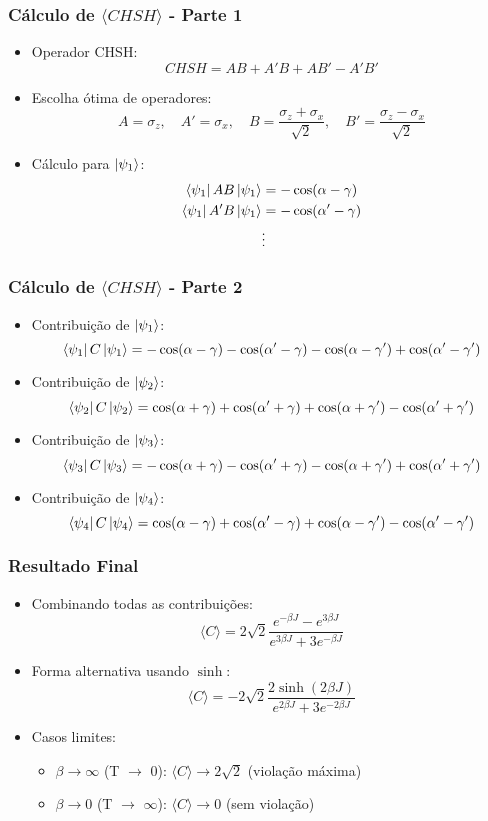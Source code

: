 \documentclass{beamer}
\begin{document}
	\begin{frame}
		\frametitle{Cálculo de $\langle CHSH \rangle$ - Parte 1}
		\begin{itemize}
			\item Operador CHSH:
			\[
			CHSH = AB + A'B + AB' - A'B'
			\]
			\item Escolha ótima de operadores:
			\[
			A = \sigma_z, \quad A' = \sigma_x, \quad B = \frac{\sigma_z + \sigma_x}{\sqrt{2}}, \quad B' = \frac{\sigma_z - \sigma_x}{\sqrt{2}}
			\]
			\item Cálculo para $\ket{\psi_1}$:
			\begin{align*}
				\bra{\psi_1}AB\ket{\psi_1} &= -\cos(\alpha - \gamma) \\
				\bra{\psi_1}A'B\ket{\psi_1} &= -\cos(\alpha' - \gamma) \\
				&\vdots
			\end{align*}
		\end{itemize}
	\end{frame}
	
	\begin{frame}
		\frametitle{Cálculo de $\langle CHSH \rangle$ - Parte 2}
		\begin{itemize}
			\item Contribuição de $\ket{\psi_1}$:
			\[
			\bra{\psi_1}C\ket{\psi_1} = -\cos(\alpha-\gamma) - \cos(\alpha'-\gamma) - \cos(\alpha-\gamma') + \cos(\alpha'-\gamma')
			\]
			\item Contribuição de $\ket{\psi_2}$:
			\[
			\bra{\psi_2}C\ket{\psi_2} = \cos(\alpha+\gamma) + \cos(\alpha'+\gamma) + \cos(\alpha+\gamma') - \cos(\alpha'+\gamma')
			\]
			\item Contribuição de $\ket{\psi_3}$:
			\[
			\bra{\psi_3}C\ket{\psi_3} = -\cos(\alpha+\gamma) - \cos(\alpha'+\gamma) - \cos(\alpha+\gamma') + \cos(\alpha'+\gamma')
			\]
			\item Contribuição de $\ket{\psi_4}$:
			\[
			\bra{\psi_4}C\ket{\psi_4} = \cos(\alpha-\gamma) + \cos(\alpha'-\gamma) + \cos(\alpha-\gamma') - \cos(\alpha'-\gamma')
			\]
		\end{itemize}
	\end{frame}
	
	\begin{frame}
		\frametitle{Resultado Final}
		\begin{itemize}
			\item Combinando todas as contribuições:
			\[
			\langle C \rangle = 2\sqrt{2} \frac{e^{-\beta J} - e^{3\beta J}}{e^{3\beta J} + 3e^{-\beta J}}
			\]
			\item Forma alternativa usando $\sinh$:
			\[
			\langle C \rangle = -2\sqrt{2} \frac{2\sinh(2\beta J)}{e^{2\beta J} + 3e^{-2\beta J}}
			\]
			\item Casos limites:
			\begin{itemize}
				\item $\beta \to \infty$ (T $\to$ 0): $\langle C \rangle \to 2\sqrt{2}$ (violação máxima)
				\item $\beta \to 0$ (T $\to$ $\infty$): $\langle C \rangle \to 0$ (sem violação)
			\end{itemize}
		\end{itemize}
	\end{frame}
	
\end{document}
